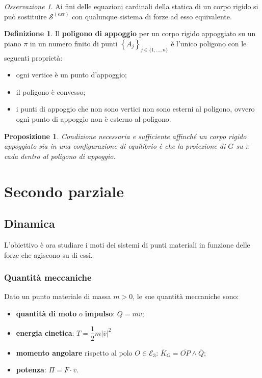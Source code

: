 \documentclass{book}
\theoremstyle{plain}
\theoremstyle{plain}
\theoremstyle{plain}
\theoremstyle{plain}
\theoremstyle{plain}
\newtheorem{prop}{Proposizione}[chapter]
\theoremstyle{definition}
\newtheorem{defi}{Definizione}[chapter]
\theoremstyle{remark}
\newtheorem*{oss}{Osservazione}
\theoremstyle{definition}
\begin{document}
\begin{oss}
    Ai fini delle equazioni cardinali della statica di un corpo rigido si può sostituire $\mathcal{S}^{(ext)}$ con qualunque sistema di forze ad esso equivalente.
\end{oss}

\begin{defi}
    Il \textbf{poligono di appoggio} per un corpo rigido appoggiato su un piano $\pi$ in un numero finito di punti $\left\{A_j\right\}_{j \in \{1, \ldots, n\}}$ è l'unico poligono con le seguenti proprietà:
    \begin{itemize}
        \item ogni vertice è un punto d'appoggio;
        \item il poligono è convesso;
        \item i punti di appoggio che non sono vertici non sono esterni al poligono, ovvero ogni punto di appoggio non è esterno al poligono.
    \end{itemize}
\end{defi}

\begin{prop}
    Condizione necessaria e sufficiente affinché un corpo rigido appoggiato sia in una configurazione di equilibrio è che la proiezione di $G$ su $\pi$ cada dentro al poligono di appoggio.
\end{prop}

\part{Secondo parziale}

\chapter{Dinamica}

L'obiettivo è ora studiare i moti dei sistemi di punti materiali in funzione delle forze che agiscono su di essi.

\section{Quantità meccaniche}

Dato un punto materiale di massa $m>0$, le sue quantità meccaniche sono:
\begin{itemize}
    \item \textbf{quantità di moto} o \textbf{impulso}: $\overline{Q}=m\overline{v}$;
    \item \textbf{energia cinetica}: $T=\dfrac{1}{2}m|\overline{v}|^2$
    \item \textbf{momento angolare} rispetto al polo $O \in \mathcal{E}_3$: $\overline{K}_O = \overline{OP} \wedge \overline{Q}$;
    \item \textbf{potenza}: $\Pi = \overline{F} \cdot \overline{v}$.
\end{itemize}
\end{document}
